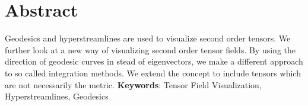 \documentclass[main.tex]{subfiles}
\begin{document}
\section*{Abstract}      
Geodesics and hyperstreamlines are used to visualize second order tensors. 
We further look at a new way of visualizing second order tensor fields. By using 
the direction of geodesic curves in stead of eigenvectors, we make a different approach 
to so called integration methods. We extend the concept to include tensors which are not 
necessarily the metric.
\newline
\newline
\hspace{-7mm}\textbf{Keywords}: Tensor Field Visualization, Hyperstreamlines, Geodesics       

\newpage\null
\end{document}
